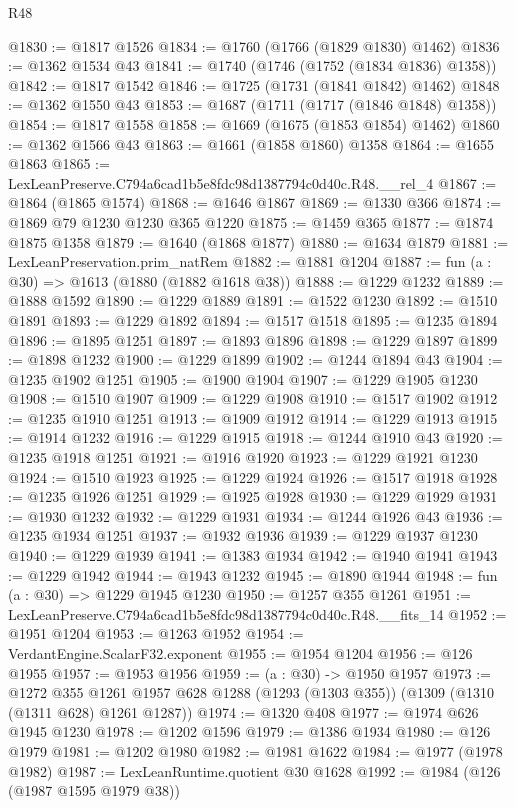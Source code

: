 \begin{lexlean}{R48}
\begin{coremodule}
@1830 := @1817 @1526
@1834 := @1760 (@1766 (@1829 @1830) @1462)
@1836 := @1362 @1534 @43
@1841 := @1740 (@1746 (@1752 (@1834 @1836) @1358))
@1842 := @1817 @1542
@1846 := @1725 (@1731 (@1841 @1842) @1462)
@1848 := @1362 @1550 @43
@1853 := @1687 (@1711 (@1717 (@1846 @1848) @1358))
@1854 := @1817 @1558
@1858 := @1669 (@1675 (@1853 @1854) @1462)
@1860 := @1362 @1566 @43
@1863 := @1661 (@1858 @1860) @1358
@1864 := @1655 @1863
@1865 := LexLeanPreserve.C794a6cad1b5e8fdc98d1387794c0d40c.R48.__rel_4
@1867 := @1864 (@1865 @1574)
@1868 := @1646 @1867
@1869 := @1330 @366
@1874 := @1869 @79 @1230 @1230 @365 @1220
@1875 := @1459 @365
@1877 := @1874 @1875 @1358
@1879 := @1640 (@1868 @1877)
@1880 := @1634 @1879
@1881 := LexLeanPreservation.prim_natRem
@1882 := @1881 @1204
@1887 := fun (a : @30) => @1613 (@1880 (@1882 @1618 @38))
@1888 := @1229 @1232
@1889 := @1888 @1592
@1890 := @1229 @1889
@1891 := @1522 @1230
@1892 := @1510 @1891
@1893 := @1229 @1892
@1894 := @1517 @1518
@1895 := @1235 @1894
@1896 := @1895 @1251
@1897 := @1893 @1896
@1898 := @1229 @1897
@1899 := @1898 @1232
@1900 := @1229 @1899
@1902 := @1244 @1894 @43
@1904 := @1235 @1902 @1251
@1905 := @1900 @1904
@1907 := @1229 @1905 @1230
@1908 := @1510 @1907
@1909 := @1229 @1908
@1910 := @1517 @1902
@1912 := @1235 @1910 @1251
@1913 := @1909 @1912
@1914 := @1229 @1913
@1915 := @1914 @1232
@1916 := @1229 @1915
@1918 := @1244 @1910 @43
@1920 := @1235 @1918 @1251
@1921 := @1916 @1920
@1923 := @1229 @1921 @1230
@1924 := @1510 @1923
@1925 := @1229 @1924
@1926 := @1517 @1918
@1928 := @1235 @1926 @1251
@1929 := @1925 @1928
@1930 := @1229 @1929
@1931 := @1930 @1232
@1932 := @1229 @1931
@1934 := @1244 @1926 @43
@1936 := @1235 @1934 @1251
@1937 := @1932 @1936
@1939 := @1229 @1937 @1230
@1940 := @1229 @1939
@1941 := @1383 @1934
@1942 := @1940 @1941
@1943 := @1229 @1942
@1944 := @1943 @1232
@1945 := @1890 @1944
@1948 := fun (a : @30) => @1229 @1945 @1230
@1950 := @1257 @355 @1261
@1951 := LexLeanPreserve.C794a6cad1b5e8fdc98d1387794c0d40c.R48.__fits_14
@1952 := @1951 @1204
@1953 := @1263 @1952
@1954 := VerdantEngine.ScalarF32.exponent
@1955 := @1954 @1204
@1956 := @126 @1955
@1957 := @1953 @1956
@1959 := (a : @30) -> @1950 @1957
@1973 := @1272
    @355
    @1261
    @1957
    @628
    @1288
    (@1293 (@1303 @355))
    (@1309 (@1310 (@1311 @628) @1261 @1287))
@1974 := @1320 @408
@1977 := @1974 @626 @1945 @1230
@1978 := @1202 @1596
@1979 := @1386 @1934
@1980 := @126 @1979
@1981 := @1202 @1980
@1982 := @1981 @1622
@1984 := @1977 (@1978 @1982)
@1987 := LexLeanRuntime.quotient @30 @1628
@1992 := @1984 (@126 (@1987 @1595 @1979 @38))

\end{coremodule}
\end{lexlean}
